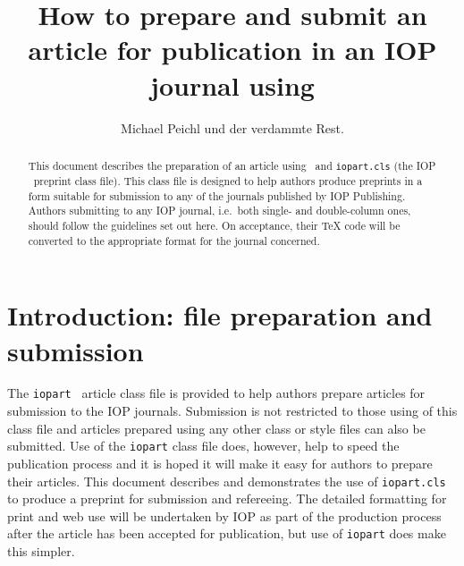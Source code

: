 \documentclass[12pt]{iopart}
\begin{document}
\title[Author guidelines for IOP journals in  \LaTeXe]{How to prepare and submit an article for 
publication in an IOP journal using \LaTeXe}

\author{Michael Peichl und der verdammte Rest.}

\address{IOP 
Publishing, Dirac
House, Temple Back, Bristol BS1 6BE, UK}
\begin{abstract}
This document describes the  preparation of an article using \LaTeXe\ and 
\verb"iopart.cls" (the IOP \LaTeXe\ preprint class file).
This class file is designed to help 
authors produce preprints in a form suitable for submission to any of the
journals published by IOP Publishing.
Authors submitting to any IOP journal, i.e.\ 
both single- and double-column ones, should follow the guidelines set out here. 
On acceptance, their TeX code will be converted to 
the appropriate format for the journal concerned.

\end{abstract}

\maketitle

\section{Introduction: file preparation and submission}
The \verb"iopart" \LaTeXe\ article class file is provided to help authors prepare articles for submission to the IOP journals. Submission is not restricted to those using of this class file and articles prepared using any other class or style files can also be submitted. Use of the \verb"iopart" class file does, however, help to speed the publication process and it is hoped it will make it easy for authors to prepare their articles. This document describes and demonstrates the use of \verb"iopart.cls" to produce a preprint for submission and refereeing. The detailed formatting for print and web use will be undertaken by IOP as part of the production process after the article has been accepted for publication, but use of \verb"iopart" does make this simpler.
\end{document}
